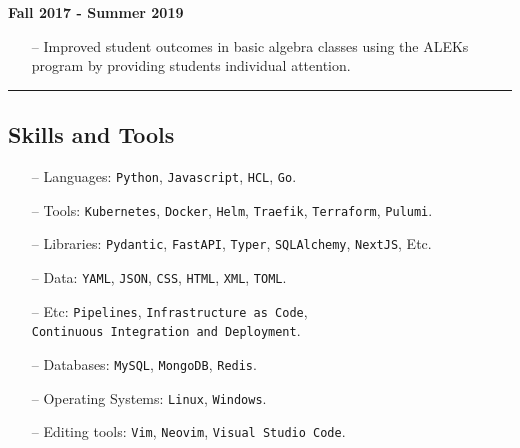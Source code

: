 \documentclass{article}
\begin{document}
\textbf{Fall 2017 - Summer 2019}

\begin{itemize}
\tightlist
\item[--]
  Improved student outcomes in basic algebra classes using the ALEKs
  program by providing students individual attention.
\end{itemize}

\rule{\textwidth}{0.1pt}
\begin{center}
\section*{Skills and Tools}\label{skills-and-tools}
\end{center}

\begin{itemize}
\tightlist
\item[--]
  Languages: \texttt{Python}, \texttt{Javascript}, \texttt{HCL},
  \texttt{Go}.
\item[--]
  Tools: \texttt{Kubernetes}, \texttt{Docker}, \texttt{Helm},
  \texttt{Traefik}, \texttt{Terraform}, \texttt{Pulumi}.
\item[--]   
  Libraries: \texttt{Pydantic}, \texttt{FastAPI}, \texttt{Typer},
  \texttt{SQLAlchemy}, \texttt{NextJS}, Etc.
\item[--]
  Data: \texttt{YAML}, \texttt{JSON}, \texttt{CSS}, \texttt{HTML},
  \texttt{XML}, \texttt{TOML}.
\item[--]
  Etc: \texttt{Pipelines}, \texttt{Infrastructure\ as\ Code},
  \texttt{Continuous\ Integration\ and\ Deployment}.
\item[--]
  Databases: \texttt{MySQL}, \texttt{MongoDB}, \texttt{Redis}.
\item[--]
  Operating Systems: \texttt{Linux}, \texttt{Windows}.
\item[--]
  Editing tools: \texttt{Vim}, \texttt{Neovim},
  \texttt{Visual\ Studio\ Code}.
\end{itemize}
\end{document}

